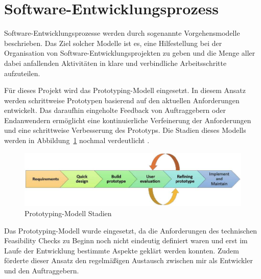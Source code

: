 \section{Software-Entwicklungsprozess}
Software-Entwicklungsprozesse werden durch sogenannte Vorgehensmodelle beschrieben. Das Ziel solcher Modelle ist es, eine Hilfestellung bei der Organisation von Software-Entwicklungsprojekten zu geben und die Menge aller dabei anfallenden Aktivitäten in klare und verbindliche Arbeitsschritte aufzuteilen. 

Für dieses Projekt wird das Prototyping-Modell eingesetzt. In diesem Ansatz werden schrittweise Prototypen basierend auf den aktuellen Anforderungen entwickelt. Das daraufhin eingeholte Feedback von Auftraggebern oder Endanwendern ermöglicht eine kontinuierliche Verfeinerung der Anforderungen und eine schrittweise Verbesserung des Prototyps. Die Stadien dieses Modells werden in Abbildung~\ref{fig:Prototyping-Modell} nochmal verdeutlicht \cite{senarath2021waterfall}.

\begin{figure}[h!]
    \centering
    \includegraphics[]{bilder/Prototyping_Stages.jpg}
    \caption{Prototyping-Modell Stadien}
    \label{fig:Prototyping-Modell}
\end{figure}

Das Prototyping-Modell wurde eingesetzt, da die Anforderungen des technischen Feasibility Checks zu Beginn noch nicht eindeutig definiert waren und erst im Laufe der Entwicklung bestimmte Aspekte geklärt werden konnten. Zudem förderte dieser Ansatz den regelmäßigen Austausch zwischen mir als Entwickler und den Auftraggebern.